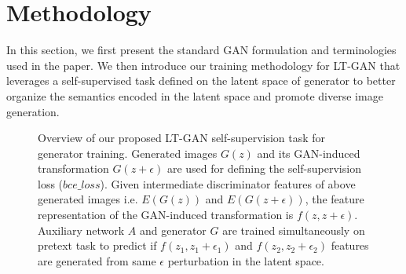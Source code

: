 \documentclass[10pt,twocolumn,letterpaper]{article}
\begin{document}
\section{Methodology}
In this section, we first present the standard GAN formulation and terminologies used in the paper. We then introduce our training methodology for LT-GAN that leverages a self-supervised task defined on the latent space of generator to better organize the semantics encoded in the latent space and promote diverse image generation.


\begin{figure*}[t]
\centering
{}
   \caption{\footnotesize{Overview of our proposed LT-GAN self-supervision task for generator training. Generated images $G(z)$ and its GAN-induced transformation $G(z+\epsilon)$ are used for defining the self-supervision loss ($bce\_loss$). Given intermediate discriminator features of above generated images i.e. $E(G(z))$ and $E(G(z+\epsilon))$, the feature representation of the GAN-induced transformation is $f(z , z+\epsilon)$. Auxiliary network $A$ and generator $G$ are trained simultaneously on pretext task to predict if $f(z_1,z_1+\epsilon_1)$ and  $f(z_2,z_2+\epsilon_2)$ features are generated from same $\epsilon$ perturbation in the latent space. }}
\label{fig:flowchart}
\end{figure*}
\end{document}
